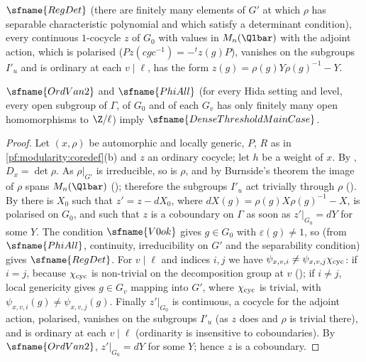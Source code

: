 \begin{definition}
\begin{enumerate}[label=(\alph*)]
$\sfname{RegDet}$ (there are finitely many elements of $G'$ at which $\rho$ has separable characteristic polynomial and
which satisfy a determinant condition), every continuous $1$-cocycle $z$ of $G_0$ with values in $M_n(\Qlbar)$ with the
adjoint action, which is polarised ($Pz(cgc^{-1})=-{}^tz(g)P$), vanishes on the subgroups $I'_u$ and is
ordinary at each $v\mid\ell$, has the form $z(g)=\rho(g)Y\rho(g)^{-1}-Y$.
\end{enumerate}
\end{definition}

\begin{lemma}\label{pf:modularity:coreof}
$\sfname{OrdVan2}$ and $\sfname{PhiAll}$ (for every Hida setting and level, every open subgroup of $\Gamma$, of $G_0$ and of
each $G_v$ has only finitely many open homomorphisms to $\Z/\ell$) imply $\sfname{DenseThresholdMainCase}$.
\end{lemma}

\begin{proof}
Let $(x,\rho)$ be automorphic and locally generic, $P$, $R$ as in \cref{pf:modularity:coredef}(b) and $z$ an ordinary
cocycle; let $h$ be a weight of $x$. By , $D_x=\det\rho$. As $\rho|_{G'}$ is
irreducible, so is $\rho$, and by Burnside's theorem the image of $\rho$ spans $M_n(\Qlbar)$
(); therefore the subgroups $I'_u$ act trivially through $\rho$
(). By  there is $X_0$ such that
$z'=z-dX_0$, where $dX(g)=\rho(g)X\rho(g)^{-1}-X$, is polarised on $G_0$, and such that $z$ is a coboundary on $\Gamma$ as
soon as $z'|_{G_0}=dY$ for some $Y$. The condition $\sfname{V0ok}$ gives $g\in G_0$ with $\varepsilon(g)\ne1$, so
 (from $\sfname{PhiAll}$, continuity, irreducibility on $G'$ and the separability
condition) gives $\sfname{RegDet}$. For $v\mid\ell$ and indices $i,j$ we have $\psi_{x,v,i}\ne\psi_{x,v,j}\chi_{\mathrm{cyc}}$: if $i=j$, because
$\chi_{\mathrm{cyc}}$ is non-trivial on the decomposition group at $v$ (); if $i\ne j$,
local genericity gives $g\in G_v$ mapping into $G'$, where $\chi_{\mathrm{cyc}}$ is trivial, with
$\psi_{x,v,i}(g)\ne\psi_{x,v,j}(g)$. Finally $z'|_{G_0}$ is continuous, a cocycle for the adjoint action, polarised, vanishes
on the subgroups $I'_u$ (as $z$ does and $\rho$ is trivial there), and is ordinary at each $v\mid\ell$
(ordinarity is insensitive to coboundaries). By $\sfname{OrdVan2}$, $z'|_{G_0}=dY$ for some $Y$; hence $z$ is a coboundary.
\end{proof}

